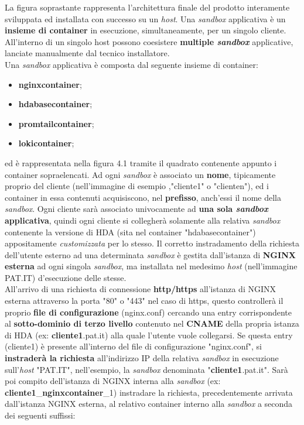 La figura soprastante rappresenta l'architettura finale del prodotto interamente sviluppata ed installata con successo su un \textit{host}. 
Una \textit{sandbox} applicativa è un \textbf{insieme di container} in esecuzione, simultaneamente, per un singolo cliente. All'interno di un singolo host possono coesistere \textbf{multiple \textit{sandbox}} applicative, lanciate manualmente dal tecnico installatore.\\
Una \textit{sandbox} applicativa è composta dal seguente insieme di container:
\begin{itemize}
	\item \textbf{nginxcontainer};
	\item \textbf{hdabasecontainer};
	\item \textbf{promtailcontainer};
	\item \textbf{lokicontainer};
\end{itemize}
ed è rappresentata nella figura 4.1 tramite il quadrato contenente appunto i container sopraelencati. Ad ogni \textit{sandbox} è associato un \textbf{nome}, tipicamente proprio del cliente (nell'immagine di esempio ,"cliente1" o "clienten"), ed i container in essa contenuti acquisiscono, nel \textbf{prefisso}, anch'essi il nome della \textit{sandbox}. Ogni cliente sarà associato univocamente ad \textbf{una sola \textit{sandbox} applicativa}, quindi ogni cliente si collegherà solamente alla relativa \textit{sandbox} contenente la versione di HDA (sita nel container "hdabasecontainer") appositamente \textit{customizzata} per lo stesso.
Il corretto instradamento della richiesta dell'utente esterno ad una determinata \textit{sandbox} è gestita dall'istanza di \textbf{NGINX esterna} ad ogni singola \textit{sandbox}, ma installata nel medesimo \textit{host} (nell'immagine PAT.IT) d'esecuzione delle stesse. \\
All'arrivo di una richiesta di connessione \textbf{http/https} all'istanza di NGINX esterna attraverso la porta "80" o "443" nel caso di https, questo controllerà il proprio \textbf{file di configurazione} (nginx.conf) cercando una entry corrispondente al \textbf{sotto-dominio di terzo livello} contenuto nel \textbf{\gls{CNAME}} della propria istanza di HDA (ex: \textbf{cliente1}.pat.it) alla quale l'utente vuole collegarsi. Se questa entry (cliente1) è presente all'interno del file di configurazione "nginx.conf", si \textbf{instraderà la richiesta} all'indirizzo IP della relativa \textit{sandbox} in esecuzione sull'\textit{host} "PAT.IT", nell'esempio, la \textit{sandbox} denominata "\textbf{cliente1}.pat.it". Sarà poi compito dell'istanza di NGINX interna alla \textit{sandbox} (ex: \textbf{cliente1}\_\textbf{nginxcontainer}\_1) instradare la richiesta, precedentemente arrivata dall'istanza NGINX esterna, al relativo container interno alla \textit{sandbox} a seconda dei seguenti suffissi:
